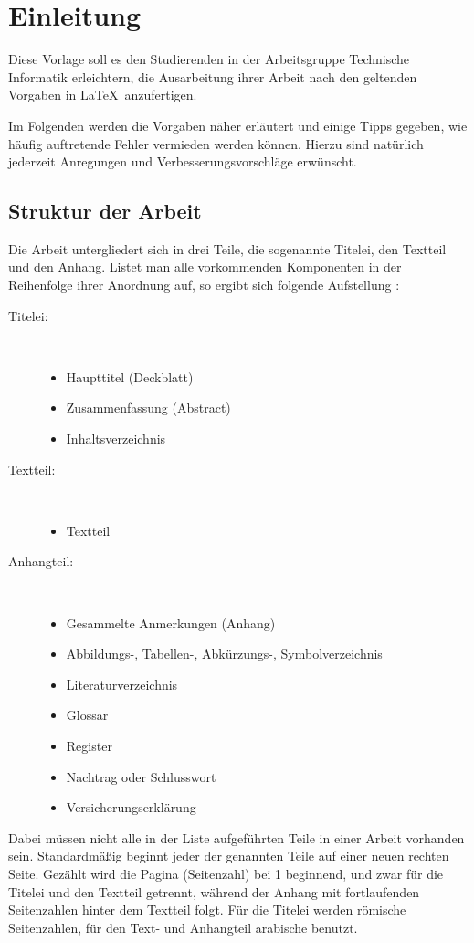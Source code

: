\chapter{Einleitung} \label{kap:einleitung}
Diese Vorlage soll es den Studierenden in der Arbeitsgruppe Technische Informatik
erleichtern, die Ausarbeitung ihrer Arbeit nach den geltenden Vorgaben
in \LaTeX\ anzufertigen.

Im Folgenden werden die Vorgaben näher erläutert und einige Tipps gegeben,
wie häufig auftretende Fehler vermieden werden können. 
Hierzu sind natürlich jederzeit Anregungen und Verbesserungsvorschläge
erwünscht.

\section{Struktur der Arbeit}
Die Arbeit untergliedert sich in drei Teile, die sogenannte Titelei,
den Textteil und den Anhang. Listet man alle vorkommenden Komponenten
in der Reihenfolge ihrer Anordnung auf, so ergibt sich folgende
Aufstellung \cite{GuKa92}:
\begin{description}
  \item[Titelei:] ~
  \begin{itemize}
    \item Haupttitel (Deckblatt)
    \item Zusammenfassung (Abstract)
    \item Inhaltsverzeichnis
  \end{itemize}
  \item[Textteil:] ~
  \begin{itemize}
    \item Textteil
  \end{itemize}
  \item[Anhangteil:] ~
  \begin{itemize}
    \item Gesammelte Anmerkungen (Anhang)
    \item Abbildungs-, Tabellen-, Abkürzungs-, Symbolverzeichnis
    \item Literaturverzeichnis
    \item Glossar
    \item Register
    \item Nachtrag oder Schlusswort
    \item Versicherungserklärung
  \end{itemize}
\end{description}
Dabei müssen nicht alle in der Liste aufgeführten Teile in einer Arbeit vorhanden sein.
Standardmäßig beginnt jeder der genannten Teile auf einer neuen rechten Seite.
Gezählt wird die Pagina (Seitenzahl) bei 1 beginnend, und zwar für die Titelei
und den Textteil getrennt, während der Anhang mit fortlaufenden Seitenzahlen hinter
dem Textteil folgt. Für die Titelei werden römische Seitenzahlen,
für den Text- und Anhangteil arabische benutzt.

